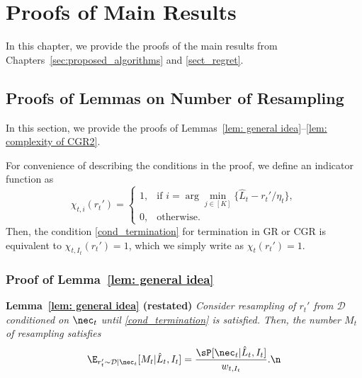 \section{Proofs of Main Results}

In this chapter, we provide the proofs of the main results from Chapters~\ref{sec:proposed_algorithms} and \ref{sect_regret}.

\subsection{Proofs of Lemmas on Number of Resampling}
In this section, we provide the proofs of Lemmas~\ref{lem: general idea}--\ref{lem: complexity of CGR2}. 

For convenience of describing the conditions in the proof, we define an indicator function as
\begin{equation*}
    \chi_{t,i}(r_t') =
    \begin{cases} 
        1, & \text{if } i = \arg\min_{j \in [K]} \{\hat{L}_t - r_t' / \eta_t\}, \\
        0, & \text{otherwise}.
    \end{cases}
\end{equation*}
Then, the condition \eqref{cond_termination} for termination in GR or CGR is equivalent to $\chi_{t,I_t}(r_t')=1$, which we simply write as $\chi_t(r_t')=1$.

\subsubsection{Proof of Lemma~\ref{lem: general idea}}\label{subsection:proof_idea}

\textbf{Lemma~\ref{lem: general idea} (restated)} 
\textit{Consider resampling of $r_t'$ from $\mathcal{D}$ conditioned on $\nec_t$ until \eqref{cond_termination} is satisfied. Then, the number $M_t$ of resampling satisfies}
\begin{align}
\E_{r_t' \sim \mathcal{D}|\nec_t}[M_t|\hat{L}_t, I_t]=\frac{\sP[\nec_t|\hat{L}_t, I_t]}{w_{t,I_t}}.\n
\end{align}

